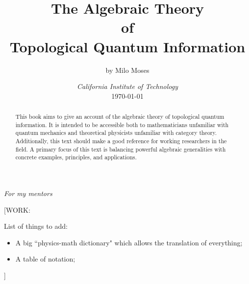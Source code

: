 \documentclass{article}
\title{The Algebraic Theory\\ of \\ Topological Quantum Information}
\author{by Milo Moses}
\date{\textit{California Institute of Technology} \\ [2ex] \today}
\numberwithin{figure}{section}
\numberwithin{equation}{section}
\begin{document}
\maketitle


\begin{abstract}
This book aims to give an account of the algebraic theory of topological quantum information. It is intended to be accessible both to mathematicians unfamiliar with quantum mechanics and theoretical physicists unfamiliar with category theory. Additionally, this text should make a good reference for working researchers in the field. A primary focus of this text is balancing powerful algebraic generalities with concrete examples, principles, and applications.
\end{abstract}

\newpage

\vspace*{\fill}
\large\textit{For my mentors} \normalsize	
\vspace*{\fill}

\newpage

%

\newpage

\tableofcontents



%

%

%

%

%

%

\appendix

%

[WORK:

List of things to add:

\begin{itemize}
\item A big ``physics-math dictionary" which allows the translation of everything;
\item A table of notation;
\end{itemize}
]



\end{document}
